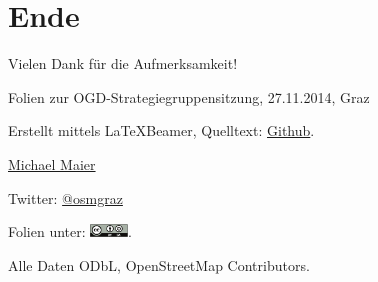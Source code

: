 \documentclass{beamer}
\begin{document}
\section{Ende}

\begin{frame}{Vielen Dank für die Aufmerksamkeit!}

  Folien zur OGD-Strategiegruppensitzung, 27.11.2014, Graz
\vspace{1cm}

Erstellt mittels \LaTeX Beamer, Quelltext: \href{https://github.com/species/vortrag-osm-ogdgraz}{Github}.
\vspace{1cm}

\href{mailto:michael.maier@student.tugraz.at}{Michael Maier}

Twitter: \href{https://twitter.com/osmgraz}{@osmgraz}
\vspace{1cm}

Folien unter: \includegraphics[width=1cm]{cc-by-sa.pdf}. 

Alle Daten ODbL, OpenStreetMap Contributors.

\end{frame}
\end{document}
